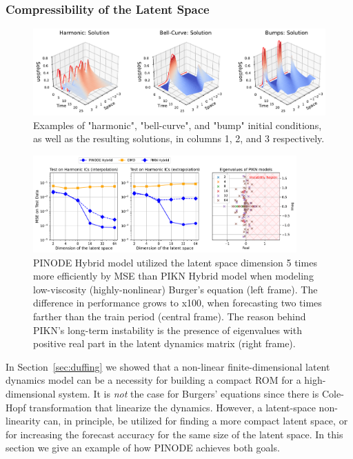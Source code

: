 \subsubsection{Compressibility of the Latent Space}

\begin{figure}
    \centering
    \includegraphics[width=\textwidth]{figures/burgers_examples_of_ics.pdf}
    \caption{Examples of "harmonic", "bell-curve", and "bump" initial conditions, as well as the resulting solutions, in columns 1, 2, and 3 respectively.}
    \label{fig:burgers_examples_of_ics}
\end{figure}

\label{sec:compressibility}
\begin{figure}[ht]
    \centering
    \includegraphics[width=0.9\textwidth]{figures/compressibility.pdf}
    \caption{PINODE Hybrid model utilized the latent space dimension 5 times more efficiently by MSE than PIKN Hybrid model when modeling low-viscosity (highly-nonlinear) Burger's equation (left frame). The difference in performance grows to x100, when forecasting two times farther than the train period (central frame). The reason behind PIKN's long-term instability is the presence of eigenvalues with positive real part in the latent dynamics matrix (right frame).}
    \label{fig:burgers_compressibility}
\end{figure}

In Section~\ref{sec:duffing} we showed that a non-linear finite-dimensional latent dynamics model can be a necessity for building a compact ROM for a high-dimensional system. It is \textit{not} the case for Burgers' equations since there is Cole-Hopf transformation that linearize the dynamics. However, a latent-space non-linearity can, in principle, be utilized for finding a more compact latent space, or for increasing the forecast accuracy for the same size of the latent space. In this section we give an example of how PINODE achieves both goals. 

